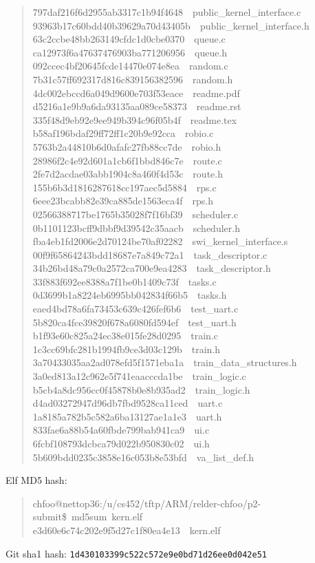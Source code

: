\documentclass[letterpaper]{article}
\begin{document}
\begin{quote}
{797daf216f6d2955ab3317c1b94f4648~~public\_kernel\_interface.c\\
93963b17c60bdd40b39629a70d43405b~~public\_kernel\_interface.h\\
63c2ccbe48bb263149cfdc1d0cbe0370~~queue.c\\
ca12973f6a47637476903ba771206956~~queue.h\\
092ccec4bf20645fcde14470e074e8ea~~random.c\\
7b31c57ff692317d816c839156382596~~random.h\\
4dc002ebccd6a049d9600e703f53eace~~readme.pdf\\
d5216a1e9b9a6da93135aa089ce58373~~readme.rst\\
335f48d9eb92e9ee949b394c96f05b4f~~readme.tex\\
b58af196bdaf29ff72ff1c20b9e92cca~~robio.c\\
5763b2a44810b6d0afafc27fb88cc7de~~robio.h\\
28986f2c4e92d601a1cb6f1bbd846c7e~~route.c\\
2fe7d2acdae03abb1904c8a460f4d53c~~route.h\\
155b6b3d1816287618cc197aec5d5884~~rps.c\\
6eee23bcabb82e39ca885de1563eca4f~~rps.h\\
02566388717be1765b35028f7f16bf39~~scheduler.c\\
0b1101123bcff9dbbf9d39542c35aacb~~scheduler.h\\
fba4eb1fd2006e2d70124be70af02282~~swi\_kernel\_interface.s\\
00f9f65864243bdd18687e7a849c72a1~~task\_descriptor.c\\
34b26bd48a79c0a2572ca700e9ea4283~~task\_descriptor.h\\
33f883f692ee8388a7f1be0b1409c73f~~tasks.c\\
0d3699b1a8224eb6995bb042834f66b5~~tasks.h\\
eaed4bd78a6fa73453c639c426fef6b6~~test\_uart.c\\
5b820ca4fce39820f678a6080fd594ef~~test\_uart.h\\
b1f93e60c825a24ec38e015fe28d0295~~train.c\\
1c3cc69bfc281b1994fb9ce3d03c129b~~train.h\\
3a70433035aa2ad078efd5f1571eba1a~~train\_data\_structures.h\\
3a0ed813a12c962e5f741eaacccda1be~~train\_logic.c\\
b5cb4a8dc956cc0f45878b0e8b935ad2~~train\_logic.h\\
d4ad03272947d96db7fbd9528ca11ced~~uart.c\\
1a8185a782b5c582a6ba13127ae1a1e3~~uart.h\\
833fae6a88b54a60fbde799bab941ca9~~ui.c\\
6fcbf108793dcbca79d022b950830c02~~ui.h\\
5b609bdd0235c3858e16c053b8e53bfd~~va\_list\_def.h
}
\end{quote}

Elf MD5 hash:
%
\begin{quote}{\ttfamily \raggedright \noindent
chfoo@nettop36:/u/cs452/tftp/ARM/relder-chfoo/p2-submit\$~md5sum~kern.elf\\
e3d60e6c74c202e9f5d27c1f80ea4e13~~kern.elf
}
\end{quote}

Git sha1 hash: \texttt{1d430103399c522c572e9e0bd71d26ee0d042e51}
\end{document}
